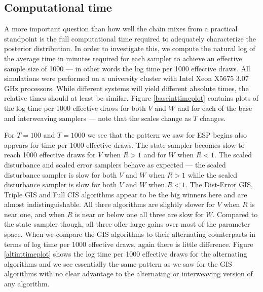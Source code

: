 \documentclass{article}
\begin{document}
\subsection{Computational time}\label{sec:LLMtime}

A more important question than how well the chain mixes from a practical standpoint is the full computational time required to adequately characterize the posterior distribution. In order to investigate this, we compute the natural log of the average time in minutes required for each sampler to achieve an effective sample size of 1000 --- in other words the log time per 1000 effective draws. All simulations were performed on a university cluster with Intel Xeon X5675 3.07 GHz processors. While different systems will yield different absolute times, the relative times should at least be similar. Figure \ref{baseinttimeplot} contains plots of the log time per 1000 effective draws for both $V$ and $W$ and for each of the base and interweaving samplers --- note that the scales change as $T$ changes. 

For $T=100$ and $T=1000$ we see that the pattern we saw for ESP begins also appears for time per 1000 effective draws. The state sampler becomes slow to reach 1000 effective draws for $V$ when $R>1$ and for $W$ when $R<1$. The scaled disturbance and scaled error samplers behave as expected --- the scaled disturbance sampler is slow for both $V$ and $W$ when $R>1$ while the scaled disturbance sampler is slow for both $V$ and $W$ when $R<1$. The Dist-Error GIS, Triple GIS and Full CIS algorithms appear to be the big winners here and are almost indistinguishable. All three algorithms are slightly slower for $V$ when $R$ is near one, and when $R$ is near or below one all three are slow for $W$. Compared to the state sampler though, all three offer large gains over most of the parameter space. When we compare the GIS algorithms to their alternating counterparts in terms of log time per 1000 effective draws, again there is little difference. Figure \ref{altinttimeplot} shows the log time per 1000 effective draws for the alternating algorithms and we see essentially the same pattern as we saw for the GIS algorithms with no clear advantage to the alternating or interweaving version of any algorithm.
\end{document}
